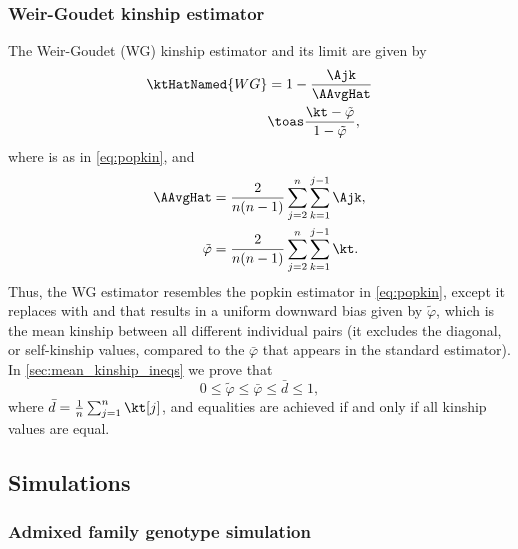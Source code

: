 \documentclass[11pt]{article}
\begin{document}
\subsubsection{Weir-Goudet kinship estimator}

The Weir-Goudet (WG) kinship estimator and its limit are given by \citep{weir_unified_2017, ochoa_estimating_2021}
\begin{align}
  \label{eq:wg}
  \ktHatNamed{WG}
  &=
    1 - \frac{\Ajk}{\AAvgHat}
  \\
  \label{eq:wg_lim}
  &\toas
    \frac{ \kt - \tilde{\varphi} }{ 1 - \tilde{\varphi} }
    ,
\end{align}
where \Ajk is as in \cref{eq:popkin}, and
\begin{equation}
  \label{eq:wg_tilde}
  \begin{split}
    \AAvgHat
    &=
    \frac{2}{n(n-1)}
    \sum_{j=2}^n
    \sum_{k=1}^{j-1}
    \Ajk
    ,\\
    \tilde{\varphi}
    &=
    \frac{2}{n(n-1)}
    \sum_{j=2}^n
    \sum_{k=1}^{j-1}
    \kt
    .
  \end{split}
\end{equation}
Thus, the WG estimator resembles the popkin estimator in \cref{eq:popkin}, except it replaces \AMinHat with \AAvgHat and that results in a uniform downward bias given by $\tilde{\varphi}$, which is the mean kinship between all different individual pairs (it excludes the diagonal, or self-kinship values, compared to the $\bar{\varphi}$ that appears in the standard estimator).
In \cref{sec:mean_kinship_ineqs} we prove that
$$
0 \le \tilde{\varphi} \le \bar{\varphi} \le \bar{d} \le 1,
$$
where $\bar{d} = \frac{1}{n} \sum_{j=1}^n \kt[j]$, and equalities are achieved if and only if all kinship values are equal.

\subsection{Simulations}

\subsubsection{Admixed family genotype simulation}
\end{document}
